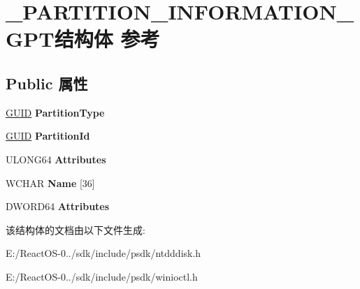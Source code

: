 \hypertarget{struct___p_a_r_t_i_t_i_o_n___i_n_f_o_r_m_a_t_i_o_n___g_p_t}{}\section{\+\_\+\+P\+A\+R\+T\+I\+T\+I\+O\+N\+\_\+\+I\+N\+F\+O\+R\+M\+A\+T\+I\+O\+N\+\_\+\+G\+P\+T结构体 参考}
\label{struct___p_a_r_t_i_t_i_o_n___i_n_f_o_r_m_a_t_i_o_n___g_p_t}
\subsection*{Public 属性}
\begin{DoxyCompactItemize}
\item 
\mbox{\label{struct___p_a_r_t_i_t_i_o_n___i_n_f_o_r_m_a_t_i_o_n___g_p_t_a3355a528387fd09bec68c56942a4d30c}} 
\hyperlink{interface_g_u_i_d}{G\+U\+ID} {\bfseries Partition\+Type}
\item 
\mbox{\label{struct___p_a_r_t_i_t_i_o_n___i_n_f_o_r_m_a_t_i_o_n___g_p_t_ac8f7ff62dedf41d7d20fd6584ad63ba3}} 
\hyperlink{interface_g_u_i_d}{G\+U\+ID} {\bfseries Partition\+Id}
\item 
\mbox{\label{struct___p_a_r_t_i_t_i_o_n___i_n_f_o_r_m_a_t_i_o_n___g_p_t_af15994e9eb123b14b2013304c10bfb26}} 
U\+L\+O\+N\+G64 {\bfseries Attributes}
\item 
\mbox{\label{struct___p_a_r_t_i_t_i_o_n___i_n_f_o_r_m_a_t_i_o_n___g_p_t_aa461b602e250c6c0958ee73b9ac2fb53}} 
W\+C\+H\+AR {\bfseries Name} \mbox{[}36\mbox{]}
\item 
\mbox{\label{struct___p_a_r_t_i_t_i_o_n___i_n_f_o_r_m_a_t_i_o_n___g_p_t_a4186a024f6d410a2b915997d1242eb08}} 
D\+W\+O\+R\+D64 {\bfseries Attributes}
\end{DoxyCompactItemize}


该结构体的文档由以下文件生成\+:\begin{DoxyCompactItemize}
\item 
E\+:/\+React\+O\+S-\/0../sdk/include/psdk/ntdddisk.\+h\item 
E\+:/\+React\+O\+S-\/0../sdk/include/psdk/winioctl.\+h\end{DoxyCompactItemize}
